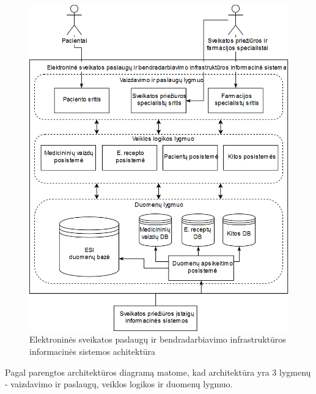 \begin{figure}[H]
    \centering
    \includegraphics[scale=0.45]{images/ESPBI}
    \caption{Elektroninės sveikatos paslaugų ir bendradarbiavimo infrastruktūros informacinės sistemos achitektūra} 
\end{figure}


Pagal parengtos architektūros diagramą matome, kad architektūra yra 3 lygmenų - vaizdavimo ir paslaugų, veiklos logikos ir duomenų lygmuo. 

